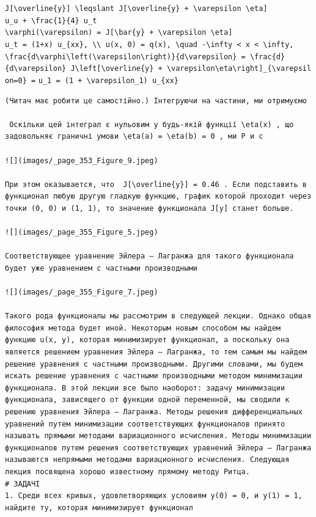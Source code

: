 \documentclass[
  ukrainian,
]{article}
\begin{document}
\texttt{J{[}\textbackslash{}overline\{y\}{]}\ \textbackslash{}leqslant\ J{[}\textbackslash{}overline\{y\}\ +\ \textbackslash{}varepsilon\ \textbackslash{}eta{]}}
\texttt{u\_u\ +\ \textbackslash{}frac\{1\}\{4\}\ u\_t}
\texttt{\textbackslash{}varphi(\textbackslash{}varepsilon)\ =\ J{[}\textbackslash{}bar\{y\}\ +\ \textbackslash{}varepsilon\ \textbackslash{}eta{]}}
\texttt{u\_t\ =\ (1+x)\ u\_\{xx\},\ \textbackslash{}\textbackslash{}\ u(x,\ 0)\ =\ q(x),\ \textbackslash{}quad\ -\textbackslash{}infty\ \textless{}\ x\ \textless{}\ \textbackslash{}infty,}
\texttt{\textbackslash{}frac\{d\textbackslash{}varphi\textbackslash{}left(\textbackslash{}varepsilon\textbackslash{}right)\}\{d\textbackslash{}varepsilon\}\ =\ \textbackslash{}frac\{d\}\{d\textbackslash{}varepsilon\}\ J\textbackslash{}left{[}\textbackslash{}overline\{y\}\ +\ \textbackslash{}varepsilon\textbackslash{}eta\textbackslash{}right{]}\textbar{}\_\{\textbackslash{}varepsilon=0\}\ =}
\texttt{u\_1\ =\ (1\ +\ \textbackslash{}varepsilon\_1)\ u\_\{xx\}}

\begin{verbatim}
(Читач має робити це самостійно.) Інтегруючи на частини, ми отримуємо

 Оскільки цей інтеграл є нульовим у будь-якій функції \eta(x) , що задовольняє граничні умови \eta(a) = \eta(b) = 0 , ми Р и с

![](images/_page_353_Figure_9.jpeg)

При этом оказывается, что  J[\overline{y}] = 0.46 . Если подставить в функционал любую другую гладкую функцию, график которой проходит через точки (0, 0) и (1, 1), то значение функционала J[y] станет больше.

![](images/_page_355_Figure_5.jpeg)

Соответствующее уравнение Эйлера — Лагранжа для такого функционала будет уже уравнением с частными производными

![](images/_page_355_Figure_7.jpeg)

Такого рода функционалы мы рассмотрим в следующей лекции. Однако общая философия метода будет иной. Некоторым новым способом мы найдем функцию u(x, y), которая минимизирует функционал, а поскольку она является решением уравнения Эйлера — Лагранжа, то тем самым мы найдем решение уравнения с частными производными. Другими словами, мы будем искать решение уравнения с частными производными методом минимизации функционала. В этой лекции все было наоборот: задачу минимизации функционала, зависящего от функции одной переменной, мы сводили к решению уравнения Эйлера — Лагранжа. Методы решения дифференциальных уравнений путем минимизации соответствующих функционалов принято называть прямыми методами вариационного исчисления. Методы минимизации функционалов путем решения соответствующих уравнений Эйлера — Лагранжа называются непрямыми методами вариационного исчисления. Следующая лекция посвящена хорошо известному прямому методу Ритца.
# ЗАДАЧІ
1. Среди всех кривых, удовлетворяющих условиям y(0) = 0, и y(1) = 1, найдите ту, которая минимизирует функционал
\end{verbatim}
\end{document}
